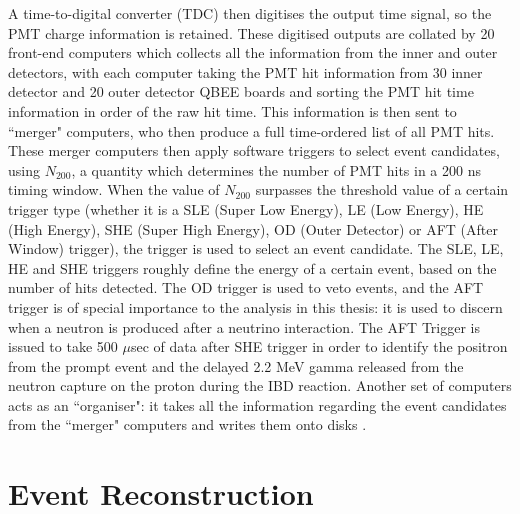 A time-to-digital converter (TDC) then digitises the output time signal, so the PMT charge information is retained. These digitised outputs are collated by 20 front-end computers which collects all the information from the inner and outer detectors, with each computer taking the PMT hit information from 30 inner detector and 20 outer detector QBEE boards and sorting the PMT hit time information in order of the raw hit time. This information is then sent to ``merger" computers, who then produce a full time-ordered list of all PMT hits. These merger computers then apply software triggers to select event candidates, using $N_{200}$, a quantity which determines the number of PMT hits in a 200 ns timing window. When the value of $N_{200}$ surpasses the threshold value of a certain trigger type (whether it is a SLE (Super Low Energy), LE (Low Energy), HE (High Energy), SHE (Super High Energy), OD (Outer Detector) or AFT (After Window) trigger), the trigger is used to select an event candidate. The SLE, LE, HE and SHE triggers roughly define the energy of a certain event, based on the number of hits detected. The OD trigger is used to veto events, and the AFT trigger is of special importance to the analysis in this thesis: it is used to discern when a neutron is produced after a neutrino interaction. The AFT Trigger is issued to take 500 $\mu$sec of data after SHE trigger in order to identify the positron from the prompt event and the delayed 2.2 MeV gamma released from the neutron capture on the proton during the IBD reaction. Another set of computers acts as an ``organiser": it takes all the information regarding the event candidates from the ``merger" computers and writes them onto disks \cite{fukuda_super-kamiokande_2003}.


\section{Event Reconstruction}

